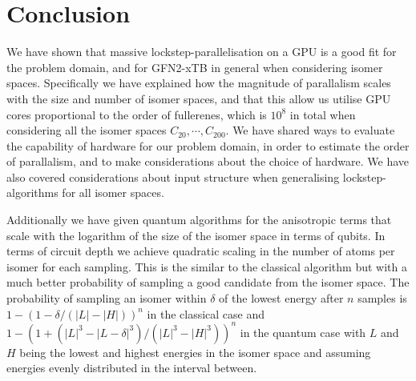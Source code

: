 \chapter{Conclusion}\label{sec:conclusion}

We have shown that massive lockstep-parallelisation on a GPU is a good fit for the problem domain, and for GFN2-xTB in general when considering isomer spaces. Specifically we have explained how the magnitude of parallalism scales with the size and number of isomer spaces, and that this allow us utilise GPU cores proportional to the order of fullerenes, which is $10^8$ in total when considering all the isomer spaces \(C_{20}, \cdots, C_{200} \). We have shared ways to evaluate the capability of hardware for our problem domain, in order to estimate the order of parallalism, and to make considerations about the choice of hardware. We have also covered considerations about input structure when generalising lockstep-algorithms for all isomer spaces.

Additionally we have given quantum algorithms for the anisotropic terms that scale with the logarithm of the size of the isomer space in terms of qubits. In terms of circuit depth we achieve quadratic scaling in the number of atoms per isomer for each sampling. This is the similar to the classical algorithm but with a much better probability of sampling a good candidate from the isomer space. The probability of sampling an isomer within $\delta$ of the lowest energy after $n$ samples is $1-(1-\delta/(|L|-|H|))^n$ in the classical case and $1-(1+(|L|^3-|L-\delta|^3)/(|L|^3-|H|^3))^n$ in the quantum case with $L$ and $H$ being the lowest and highest energies in the isomer space and assuming energies evenly distributed in the interval between.
